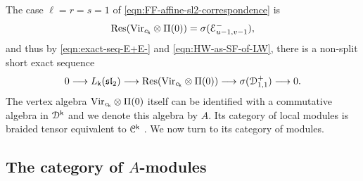 \documentclass[a4paper, reqno]{amsart}
\theoremstyle{introTheorems}
\newcommand\cC{\mathcal{C}}
\newcommand\cD{\mathcal{D}}
\newcommand\cE{\mathcal{E}}
\newcommand{\Res}{\textup{Res}}
\renewcommand\sl{\mathfrak{sl}}
\newcommand\Vir{\textup{Vir}}
\renewcommand{\1}{\mathbbold{1}}
\begin{document}
The case
$\ell=r=s=1$  of \eqref{eqn:FF-affine-sl2-correspondence} is
\begin{align*}
    \Res(\Vir_{c_\k}\otimes\Pi(0)) = \sigma(\cE_{u-1,v-1}^-),
\end{align*}
and thus by \eqref{eqn:exact-seq-E+E-} and \eqref{eqn:HW-as-SF-of-LW}, there is a non-split short exact sequence
\begin{equation}\label{eqn:A-as-Lk(sl2)-mod}
    0\longrightarrow L_\k(\sl_2) \longrightarrow \Res(\Vir_{c_\k}\otimes\Pi(0))\longrightarrow \sigma(\cD_{1,1}^+)\longrightarrow 0.
\end{equation}
The vertex algebra $\Vir_{c_\k}\otimes\Pi(0)$ itself can be identified with a commutative algebra in $\cD^\k$ \cite{HKL}  and we denote this algebra by $A$. Its category of local modules is braided tensor equivalent to $\cC^\k$ \cite{CKM}.
We now turn to its category of modules. 


\subsection{The category of \texorpdfstring{$A$-modules}{A-modules}}
\label{subsec:sl2Amodules}
\end{document}
